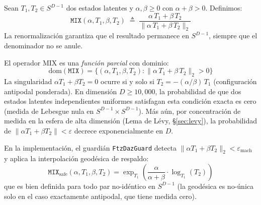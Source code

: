\begin{definition}
\label{def:mix}
Sean $T_1, T_2 \in S^{D-1}$ dos estados latentes y $\alpha, \beta \geq 0$
con $\alpha + \beta > 0$. Definimos:
\begin{equation}
\texttt{MIX}(\alpha, T_1, \beta, T_2) \;\triangleq\; 
\frac{\alpha\, T_1 + \beta\, T_2}{\|\alpha\, T_1 + \beta\, T_2\|_2}
\end{equation}
La renormalización garantiza que el resultado permanece en $S^{D-1}$,
siempre que el denominador no se anule.
\end{definition}

\begin{remark}
\label{rem:mix_singularity}
El operador MIX es una \emph{función parcial} con dominio:
\begin{equation}
\text{dom}(\texttt{MIX}) = \{(\alpha, T_1, \beta, T_2) : 
\|\alpha\, T_1 + \beta\, T_2\|_2 > 0\}
\end{equation}
La singularidad $\alpha T_1 + \beta T_2 = 0$ ocurre si y solo si
$T_2 = -(\alpha/\beta)\, T_1$ (configuración antipodal ponderada).
En dimensión $D \geq 10{,}000$, la probabilidad de que dos estados
latentes independientes uniformes satisfagan esta condición exacta
es cero (medida de Lebesgue nula en $S^{D-1} \times S^{D-1}$). 
Más aún, por concentración de medida en la esfera de alta dimensión
(Lema de Lévy, §\ref{sec:levy}), la probabilidad de 
$\|\alpha T_1 + \beta T_2\| < \varepsilon$ decrece 
exponencialmente en $D$.

En la implementación, el guardián \texttt{FtzDazGuard} detecta
$\|\alpha T_1 + \beta T_2\|_2 < \varepsilon_{\text{mach}}$ y aplica
la interpolación geodésica de respaldo:
\begin{equation}
\texttt{MIX}_{\text{safe}}(\alpha, T_1, \beta, T_2) = 
\exp_{T_1}\!\left(\frac{\alpha}{\alpha+\beta} \cdot 
\log_{T_1}(T_2)\right)
\end{equation}
que es bien definida para todo par no-idéntico en $S^{D-1}$ 
(la geodésica es no-única solo en el caso exactamente antipodal, 
que tiene medida cero).
\end{remark}

